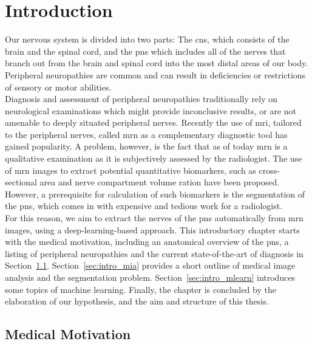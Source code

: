 \chapter{Introduction} %
Our nervous system is divided into two parts: The \gls{cns}, which consists of the brain and the spinal cord, and the \gls{pns} which includes all of the nerves that branch out from the brain and spinal cord into the most distal areas of our body. Peripheral neuropathies are common and can result in deficiencies or restrictions of sensory or motor abilities.\\
Diagnosis and assessment of peripheral neuropathies traditionally rely on neurological examinations which might provide inconclusive results, or are not amenable to deeply situated peripheral nerves. Recently the use of \gls{mri}, tailored to the peripheral nerves, called \gls{mrn} as a complementary diagnostic tool has gained popularity. A problem, however, is the fact that as of today \gls{mrn} is a qualitative examination as it is subjectively assessed by the radiologist. The use of \gls{mrn} images to extract potential quantitative biomarkers, such as cross-sectional area and nerve compartment volume ration have been proposed. However, a prerequisite for calculation of such biomarkers is the segmentation of the \gls{pns}, which comes in with expensive and tedious work for a radiologist.\\
For this reason, we aim to extract the nerves of the \gls{pns} automatically from \gls{mrn} images, using a deep-learning-based approach. This introductory chapter starts with the medical motivation, including an anatomical overview of the \gls{pns}, a listing of peripheral neuropathies and the current state-of-the-art of diagnosis in Section~\ref{sec:intro_medical}. Section~\ref{sec:intro_mia} provides a short outline of medical image analysis and the segmentation problem. Section~\ref{sec:intro_mlearn} introduces some topics of machine learning. Finally, the chapter is concluded by the elaboration of our hypothesis, and the aim and structure of this thesis.

\section{Medical Motivation} \label{sec:intro_medical} %
